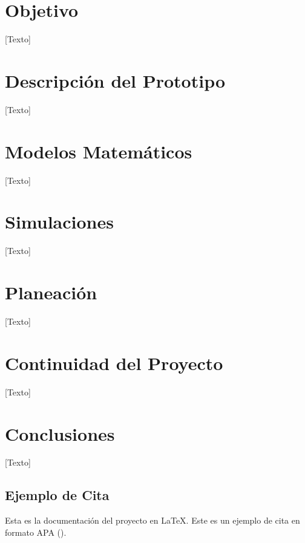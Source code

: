 \documentclass[11pt]{exam}
\begin{document}
    \section*{Objetivo}
        [Texto]
        
    \section*{Descripci\'on del Prototipo}
        [Texto]

    \section*{Modelos Matem\'aticos}
        [Texto]

    \section*{Simulaciones}
        [Texto]

    \section*{Planeaci\'on}
        [Texto]

    \section*{Continuidad del Proyecto}
        [Texto]

    \section*{Conclusiones}
        [Texto]
    
        \subsection*{Ejemplo de Cita}
        Esta es la documentación del proyecto en {\LaTeX}. Este es un ejemplo de cita en formato APA (\cite{tenorio-2018}).

    \printbibliography
\end{document}

